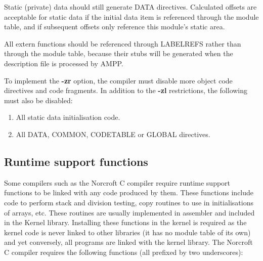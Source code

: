 Static (private) data should still generate DATA directives. Calculated
offsets are acceptable for static data if the initial data item is
referenced through the module table, and if subsequent offsets only
reference this module's static area. 

All extern functions should be referenced through LABELREFS rather than
through the module table, because their stubs will be generated when the
description file is processed by AMPP.

To implement the {\bf -zr} option, the compiler must disable more
object code directives and code fragments. In addition to the {\bf -zl}
restrictions, the following must also be disabled:

\begin{enumerate}
\item All static data initialisation code.
\item All DATA, COMMON, CODETABLE or GLOBAL directives.
\end{enumerate}

\subsection{Runtime support functions}

Some compilers such as the Norcroft C compiler require runtime support
functions to be linked with any code produced by them. These functions
include code to perform stack and division testing, copy routines to
use in initialisations of arrays, etc. These routines are usually implemented
in assembler and included in the Kernel library. Installing these functions
in the kernel is required as the kernel code is never linked to other
libraries (it has no module table of its own) and yet conversely, all programs
are linked with the kernel library.
The Norcroft C compiler requires the following functions (all prefixed by two
underscores):

